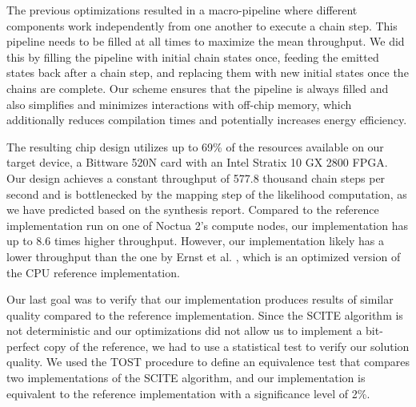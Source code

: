 The previous optimizations resulted in a macro-pipeline where different components work independently from one another to execute a chain step. This pipeline needs to be filled at all times to maximize the mean throughput. We did this by filling the pipeline with initial chain states once, feeding the emitted states back after a chain step, and replacing them with new initial states once the chains are complete. Our scheme ensures that the pipeline is always filled and also simplifies and minimizes interactions with off-chip memory, which additionally reduces compilation times and potentially increases energy efficiency.

The resulting chip design utilizes up to 69\% of the resources available on our target device, a Bittware 520N card with an Intel Stratix 10 GX 2800 \ac{FPGA}. Our design achieves a constant throughput of 577.8 thousand chain steps per second and is bottlenecked by the mapping step of the likelihood computation, as we have predicted based on the synthesis report. Compared to the reference implementation run on one of Noctua 2's compute nodes, our implementation has up to 8.6 times higher throughput. However, our implementation likely has a lower throughput than the one by Ernst et al. \cite{ernst2020Performance}, which is an optimized version of the \ac{CPU} reference implementation.

Our last goal was to verify that our implementation produces results of similar quality compared to the reference implementation. Since the \ac{SCITE} algorithm is not deterministic and our optimizations did not allow us to implement a bit-perfect copy of the reference, we had to use a statistical test to verify our solution quality. We used the \acf{TOST} procedure \cite{schuirmann1987comparison} to define an equivalence test that compares two implementations of the \ac{SCITE} algorithm, and our implementation is equivalent to the reference implementation with a significance level of 2\%.

